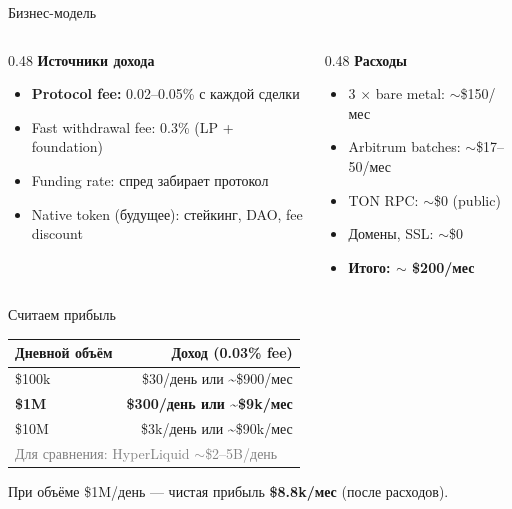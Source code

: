 \documentclass[aspectratio=169]{beamer}
\begin{document}
\begin{frame}{Бизнес-модель}

\begin{columns}[t]
\begin{column}{0.48\textwidth}
\textbf{Источники дохода}
\begin{itemize}
    \item \textbf{Protocol fee:} 0.02--0.05\% с каждой сделки
    \item Fast withdrawal fee: 0.3\% (LP + foundation)
    \item Funding rate: спред забирает протокол
    \item Native token (будущее): стейкинг, DAO, fee discount
\end{itemize}
\end{column}
\begin{column}{0.48\textwidth}
\textbf{Расходы}
\begin{itemize}
    \item 3 $\times$ bare metal: $\sim$\$150/мес
    \item Arbitrum batches: $\sim$\$17--50/мес
    \item TON RPC: $\sim$\$0 (public)
    \item Домены, SSL: $\sim$\$0
    \item \textbf{Итого: $\sim$ \$200/мес}
\end{itemize}
\end{column}
\end{columns}

\vspace{0.5em}
\begin{block}{Считаем прибыль}
\begin{tabular}{lr}
\textbf{Дневной объём} & \textbf{Доход (0.03\% fee)} \\
\hline
\$100k & \$30/день или \textasciitilde\$900/мес \\
\textbf{\$1M} & \textbf{\$300/день или \textasciitilde\$9k/мес} \\
\$10M & \$3k/день или \textasciitilde\$90k/мес \\
\hline
\multicolumn{2}{l}{\small\textcolor{gray}{Для сравнения: HyperLiquid $\sim$\$2--5B/день}} \\
\end{tabular}
\end{block}

\flushleft\small
При объёме \$1M/день --- чистая прибыль \textbf{\$8.8k/мес} (после расходов).
\end{frame}
\end{document}
